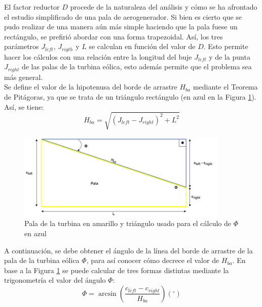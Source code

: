 El factor reductor $D$ procede de la naturaleza del análisis y cómo se ha afrontado el estudio simplificado de una pala de aerogenerador. Si bien es cierto que se pudo realizar de una manera aún más simple haciendo que la pala fuese un rectángulo, se prefirió abordar con una forma trapezoidal. Así, los tres parámetros $J_{left}$, $J_{rigth}$ y $L$ se calculan en función del valor de $D$. Esto permite hacer los cálculos con una relación entre la longitud del buje $J_{left}$ y de la punta $J_{right}$ de las palas de la turbina eólica, esto además permite que el problema sea más general. \\

Se define el valor de la hipotenusa del borde de arrastre $H_{ba}$ mediante el Teorema de Pitágoras, ya que se trata de un triángulo rectángulo (en azul en la Figura \ref{fig:pala_calculo_phi}). Así, se tiene:
\begin{equation}
H_{ba} = \sqrt{(J_{left} - J_{right})^{2} + L^{2}}
\label{def_hipotenusa_pala}
\end{equation}


\begin{figure}[H]
    \centering
    \includegraphics[width=0.9\textwidth]{images/triangulo sacar phi.drawio.png}
    \caption{Pala de la turbina en amarillo y triángulo usado para el cálculo de $\Phi$ en azul}
    
    \label{fig:pala_calculo_phi}
\end{figure}

A continuación, se debe obtener el ángulo de la línea del borde de arrastre de la pala de la turbina eólica $\Phi$, para así conocer cómo decrece el valor de $H_{ba}$.
En base a la Figura \ref{fig:pala_calculo_phi} se puede calcular de tres formas distintas mediante la trigonometría el valor del ángulo $\Phi$:
\begin{equation}
 \Phi = \arcsin{\left(\dfrac{c_{left} - c_{right}}{H_{ba}}\right)} (^{\circ})
\label{def_angulo_phi_1}
\end{equation}

